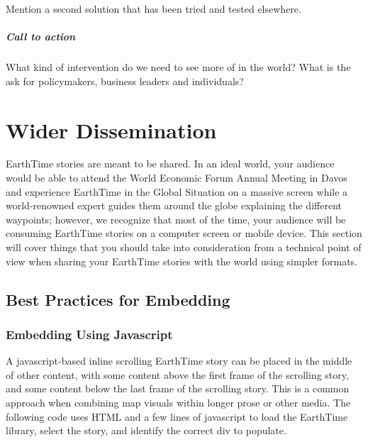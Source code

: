 \documentclass[
]{krantz}
\renewenvironment{quote}{\begin{VF}}{\end{VF}}
\begin{document}
\begin{quote}
Mention a second solution that has been tried and tested elsewhere.
\end{quote}

\hypertarget{call-to-action}{%
\paragraph*{Call to action}\label{call-to-action}}

\begin{quote}
What kind of intervention do we need to see more of in the world? What is the ask for policymakers, business leaders and individuals?
\end{quote}

\hypertarget{wider-dissemination}{%
\chapter{Wider Dissemination}\label{wider-dissemination}}

EarthTime stories are meant to be shared. In an ideal world, your audience would be able to attend the World Economic Forum Annual Meeting in Davos and experience EarthTime in the Global Situation on a massive screen while a world-renowned expert guides them around the globe explaining the different waypoints; however, we recognize that most of the time, your audience will be consuming EarthTime stories on a computer screen or mobile device. This section will cover things that you should take into consideration from a technical point of view when sharing your EarthTime stories with the world using simpler formats.

\hypertarget{best-practices-for-embedding}{%
\section{Best Practices for Embedding}\label{best-practices-for-embedding}}

\hypertarget{embedding-using-javascript}{%
\subsection*{Embedding Using Javascript}\label{embedding-using-javascript}}


A javascript-based inline scrolling EarthTime story can be placed in the middle of other content, with some content above the first frame of the scrolling story, and some content below the last frame of the scrolling story. This is a common approach when combining map visuals within longer prose or other media. The following code uses HTML and a few lines of javascript to load the EarthTime library, select the story, and identify the correct div to populate.
\end{document}
